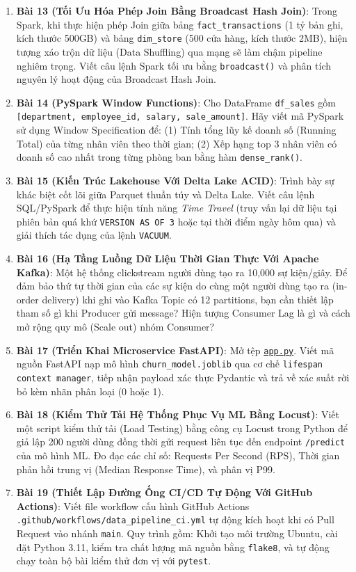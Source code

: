 \begin{baitapbox}
\begin{enumerate}
    \item \textbf{Bài 13 (Tối Ưu Hóa Phép Join Bằng Broadcast Hash Join)}: Trong Spark, khi thực hiện phép Join giữa bảng \texttt{fact\_transactions} (1 tỷ bản ghi, kích thước 500GB) và bảng \texttt{dim\_store} (500 cửa hàng, kích thước 2MB), hiện tượng xáo trộn dữ liệu (Data Shuffling) qua mạng sẽ làm chậm pipeline nghiêm trọng. Viết câu lệnh Spark tối ưu bằng \texttt{broadcast()} và phân tích nguyên lý hoạt động của Broadcast Hash Join.
    \item \textbf{Bài 14 (PySpark Window Functions)}: Cho DataFrame \texttt{df\_sales} gồm \texttt{[department, employee\_id, salary, sale\_amount]}. Hãy viết mã PySpark sử dụng Window Specification để: (1) Tính tổng lũy kế doanh số (Running Total) của từng nhân viên theo thời gian; (2) Xếp hạng top 3 nhân viên có doanh số cao nhất trong từng phòng ban bằng hàm \texttt{dense\_rank()}.
    \item \textbf{Bài 15 (Kiến Trúc Lakehouse Với Delta Lake ACID)}: Trình bày sự khác biệt cốt lõi giữa Parquet thuần túy và Delta Lake. Viết câu lệnh SQL/PySpark để thực hiện tính năng \textit{Time Travel} (truy vấn lại dữ liệu tại phiên bản quá khứ \texttt{VERSION AS OF 3} hoặc tại thời điểm ngày hôm qua) và giải thích tác dụng của lệnh \texttt{VACUUM}.
    \item \textbf{Bài 16 (Hạ Tầng Luồng Dữ Liệu Thời Gian Thực Với Apache Kafka)}: Một hệ thống clickstream người dùng tạo ra 10,000 sự kiện/giây. Để đảm bảo thứ tự thời gian của các sự kiện do cùng một người dùng tạo ra (in-order delivery) khi ghi vào Kafka Topic có 12 partitions, bạn cần thiết lập tham số gì khi Producer gửi message? Hiện tượng Consumer Lag là gì và cách mở rộng quy mô (Scale out) nhóm Consumer?
    \item \textbf{Bài 17 (Triển Khai Microservice FastAPI)}: Mở tệp \href{run:./code/ch12_mlops/app.py}{\texttt{app.py}}. Viết mã nguồn FastAPI nạp mô hình \texttt{churn\_model.joblib} qua cơ chế \texttt{lifespan context manager}, tiếp nhận payload xác thực Pydantic và trả về xác suất rời bỏ kèm nhãn phân loại (0 hoặc 1).
    \item \textbf{Bài 18 (Kiểm Thử Tải Hệ Thống Phục Vụ ML Bằng Locust)}: Viết một script kiểm thử tải (Load Testing) bằng công cụ Locust trong Python để giả lập 200 người dùng đồng thời gửi request liên tục đến endpoint \texttt{/predict} của mô hình ML. Đo đạc các chỉ số: Requests Per Second (RPS), Thời gian phản hồi trung vị (Median Response Time), và phân vị P99.
    \item \textbf{Bài 19 (Thiết Lập Đường Ống CI/CD Tự Động Với GitHub Actions)}: Viết file workflow cấu hình GitHub Actions \texttt{.github/workflows/data\_pipeline\_ci.yml} tự động kích hoạt khi có Pull Request vào nhánh \texttt{main}. Quy trình gồm: Khởi tạo môi trường Ubuntu, cài đặt Python 3.11, kiểm tra chất lượng mã nguồn bằng \texttt{flake8}, và tự động chạy toàn bộ bài kiểm thử đơn vị với \texttt{pytest}.

\end{enumerate}
\end{baitapbox}
